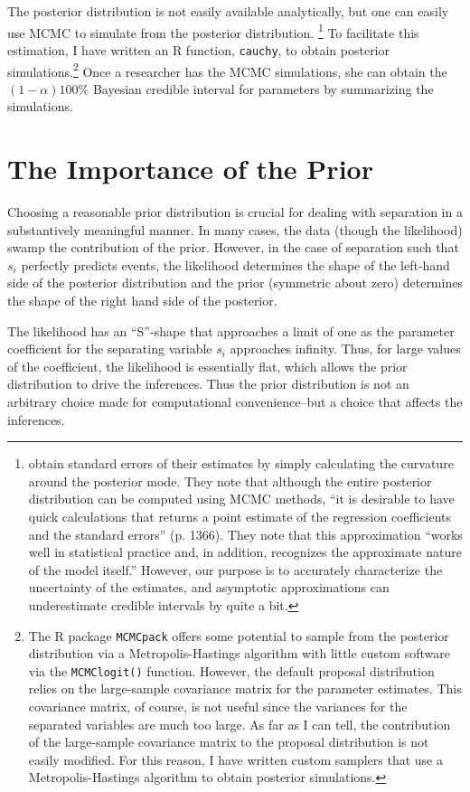 \documentclass[12pt]{article}
\begin{document}
The posterior distribution is not easily available analytically, but one can easily use MCMC to simulate from the posterior distribution. \footnote{\citep{Gelmanetal2008} obtain standard errors of their estimates by simply calculating the curvature around the posterior mode. They note that although the entire posterior distribution can be computed using MCMC methods, ``it is desirable to have quick calculations that returns a point estimate of the regression coefficients and the standard errors'' (p. 1366). They note that this approximation ``works well in statistical practice and, in addition, recognizes the approximate nature of the model itself.'' However, our purpose is to accurately characterize the uncertainty of the estimates, and asymptotic approximations can underestimate credible intervals by quite a bit.} To facilitate this estimation, I have written an R function, \texttt{cauchy}, to obtain posterior simulations.\footnote{The R package \texttt{MCMCpack} offers some potential to sample from the posterior distribution via a Metropolis-Hastings algorithm with little custom software via the \texttt{MCMClogit()} function. However, the default proposal distribution relies on the large-sample covariance matrix for the parameter estimates. This covariance matrix, of course, is not useful since the variances for the separated variables are much too large. As far as I can tell, the contribution of the large-sample covariance matrix to the proposal distribution is not easily modified. For this reason, I have written custom samplers that use a Metropolis-Hastings algorithm to obtain posterior simulations.} Once a researcher has the MCMC simulations, she can obtain the $(1 - \alpha)100\%$ Bayesian credible interval for parameters by summarizing the simulations.

\section*{The Importance of the Prior}

Choosing a reasonable prior distribution is crucial for dealing with separation in a substantively meaningful manner. In many cases, the data (though the likelihood) swamp the contribution of the prior. However, in the case of separation such that $s_i$ perfectly predicts events, the likelihood determines the shape of the left-hand side of the posterior distribution and the prior (symmetric about zero) determines the shape of the right hand side of the posterior.

The likelihood has an ``S''-shape that approaches a limit of one as the parameter coefficient for the separating variable $s_i$ approaches infinity. Thus, for large values of the coefficient, the likelihood is essentially flat, which allows the prior distribution to drive the inferences. Thus the prior distribution is not an arbitrary choice made for computational convenience--but a choice that affects the inferences.
\end{document}
